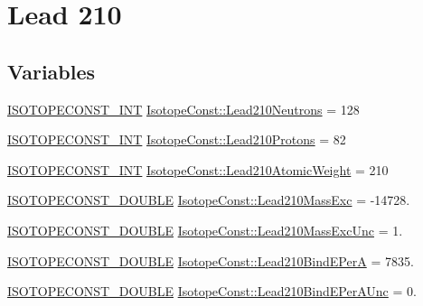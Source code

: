 \hypertarget{group___isotope_const-_lead-_pb210}{}\section{Lead 210}
\label{group___isotope_const-_lead-_pb210}
\subsection*{Variables}
\begin{DoxyCompactItemize}
\item 
\mbox{\hyperlink{group___isotope_const-_macros_ga5f18360b3e99483a35c32d789e62621c}{I\+S\+O\+T\+O\+P\+E\+C\+O\+N\+S\+T\+\_\+\+I\+NT}} \mbox{\hyperlink{group___isotope_const-_lead-_pb210_ga12d400daee812fa41f0bb924b3be6141}{Isotope\+Const\+::\+Lead210\+Neutrons}} = 128
\item 
\mbox{\hyperlink{group___isotope_const-_macros_ga5f18360b3e99483a35c32d789e62621c}{I\+S\+O\+T\+O\+P\+E\+C\+O\+N\+S\+T\+\_\+\+I\+NT}} \mbox{\hyperlink{group___isotope_const-_lead-_pb210_ga41f1fe8422b0128308be360c5e98758f}{Isotope\+Const\+::\+Lead210\+Protons}} = 82
\item 
\mbox{\hyperlink{group___isotope_const-_macros_ga5f18360b3e99483a35c32d789e62621c}{I\+S\+O\+T\+O\+P\+E\+C\+O\+N\+S\+T\+\_\+\+I\+NT}} \mbox{\hyperlink{group___isotope_const-_lead-_pb210_ga6d7f130937c109f62f637f9352b52a7a}{Isotope\+Const\+::\+Lead210\+Atomic\+Weight}} = 210
\item 
\mbox{\hyperlink{group___isotope_const-_macros_ga8f45a7272ce02c0b4c65c44636ed719a}{I\+S\+O\+T\+O\+P\+E\+C\+O\+N\+S\+T\+\_\+\+D\+O\+U\+B\+LE}} \mbox{\hyperlink{group___isotope_const-_lead-_pb210_ga12aca40b8e08649ab20a75fdffa0c2f1}{Isotope\+Const\+::\+Lead210\+Mass\+Exc}} = -\/14728.
\item 
\mbox{\hyperlink{group___isotope_const-_macros_ga8f45a7272ce02c0b4c65c44636ed719a}{I\+S\+O\+T\+O\+P\+E\+C\+O\+N\+S\+T\+\_\+\+D\+O\+U\+B\+LE}} \mbox{\hyperlink{group___isotope_const-_lead-_pb210_ga05e453cb2a70d377b739bedb4f37980f}{Isotope\+Const\+::\+Lead210\+Mass\+Exc\+Unc}} = 1.
\item 
\mbox{\hyperlink{group___isotope_const-_macros_ga8f45a7272ce02c0b4c65c44636ed719a}{I\+S\+O\+T\+O\+P\+E\+C\+O\+N\+S\+T\+\_\+\+D\+O\+U\+B\+LE}} \mbox{\hyperlink{group___isotope_const-_lead-_pb210_ga1b04c26eb15b7b1a0da89495e77542c5}{Isotope\+Const\+::\+Lead210\+Bind\+E\+PerA}} = 7835.
\item 
\mbox{\hyperlink{group___isotope_const-_macros_ga8f45a7272ce02c0b4c65c44636ed719a}{I\+S\+O\+T\+O\+P\+E\+C\+O\+N\+S\+T\+\_\+\+D\+O\+U\+B\+LE}} \mbox{\hyperlink{group___isotope_const-_lead-_pb210_ga7ebc7217036dccbfc50b781d4f84b41e}{Isotope\+Const\+::\+Lead210\+Bind\+E\+Per\+A\+Unc}} = 0.

\end{DoxyCompactItemize}

